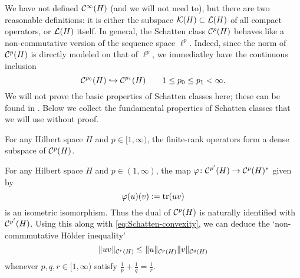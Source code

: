 We have not defined $\mathcal{C}^\infty(H)$ (and we will not need to), but there are two reasonable definitions: it is either the subspace $\mathcal{K}(H) \subset \mathcal{L}(H)$ of all compact operators, or $\mathcal{L}(H)$ itself.
In general, the Schatten class $\mathcal{C}^{p}(H)$ behaves like a non-commutative version of the sequence space $\ell^{p}$.
Indeed, since the norm of $\mathcal{C}^{p}(H)$ is directly modeled on that of $\ell^{p}$, we immediatley have the continuous inclusion
\begin{equation*}
  \mathcal{C}^{p_{0}}(H) \hookrightarrow \mathcal{C}^{p_{1}}(H) \qquad 1 \leq p_0 \leq p_1 < \infty.
\end{equation*}
We will not prove the basic properties of Schatten classes here; these can be found in \cite[Appendix D]{HNVW16}.
Below we collect the fundamental properties of Schatten classes that we will use without proof.

\begin{prop}
  For any Hilbert space $H$ and $p \in [1,\infty)$, the finite-rank operators form a dense subspace of $\mathcal{C}^{p}(H)$.
\end{prop}

\begin{prop}[Duality]\label{prop:Schatten-duality}
  For any Hilbert space $H$ and $p \in (1,\infty)$, the map $\varphi \colon \mathcal{C}^{p'}(H) \rightarrow \mathcal{C}^{p}(H)^*$ given by
  \begin{equation*}
    \varphi(u)(v) := \operatorname{tr}(uv)
  \end{equation*}
  is an isometric isomorphism.
  Thus the dual of $\mathcal{C}^{p}(H)$ is naturally identified with $\mathcal{C}^{p'}(H)$.
  Using this along with \ref{eq:Schatten-convexity}, we can deduce the `non-commmutative H\"older inequality'
  \begin{equation}\label{eq:NC-holder}
    \|uv\|_{\mathcal{C}^{r}(H)} \leq \|u\|_{\mathcal{C}^{p}(H)} \|v\|_{\mathcal{C}^{q}(H)}
  \end{equation}
  whenever $p,q,r \in [1,\infty)$ satisfy $\frac{1}{p} + \frac{1}{q} = \frac{1}{r}$.
\end{prop}

